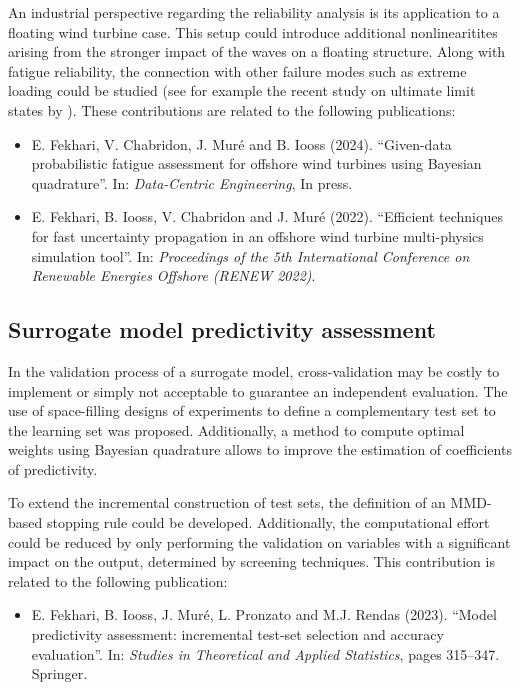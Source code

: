 An industrial perspective regarding the reliability analysis is its application to a floating wind turbine case. 
This setup could introduce additional nonlinearitites arising from the stronger impact of the waves on a floating structure. 
Along with fatigue reliability, the connection with other failure modes such as extreme loading could be studied (see for example the recent study on ultimate limit states by \citealp{wang_schar_2023_uls}). 
These contributions are related to the following publications:
\begin{itemize}
    \footnotesize
    \item[\ding{125}] E. Fekhari, V. Chabridon, J. Muré and B. Iooss (2024). ``Given-data probabilistic fatigue assessment for offshore wind turbines using Bayesian quadrature''. In: \textit{Data-Centric Engineering}, In press.
    \item[\ding{125}] E. Fekhari, B. Iooss, V. Chabridon and J. Muré (2022). ``Efficient techniques for fast uncertainty propagation in an offshore wind turbine multi-physics simulation tool''. In: \textit{Proceedings of the 5th International Conference on Renewable Energies Offshore (RENEW 2022)}.
\end{itemize}

\subsection*{Surrogate model predictivity assessment}

In the validation process of a surrogate model, cross-validation may be costly to implement or simply not acceptable to guarantee an independent evaluation.  
The use of space-filling designs of experiments to define a complementary test set to the learning set was proposed. 
Additionally, a method to compute optimal weights using Bayesian quadrature allows to improve the estimation of coefficients of predictivity. 

To extend the incremental construction of test sets, the definition of an MMD-based stopping rule could be developed. 
Additionally, the computational effort could be reduced by only performing the validation on variables with a significant impact on the output, determined by screening techniques. 
This contribution is related to the following publication:
\begin{itemize}
    \footnotesize
    \item[\ding{125}] E. Fekhari, B. Iooss, J. Muré, L. Pronzato and M.J. Rendas (2023). ``Model predictivity assessment: incremental test-set selection and accuracy evaluation''. In: \textit{Studies in Theoretical and Applied Statistics}, pages 315--347. Springer.
\end{itemize}

